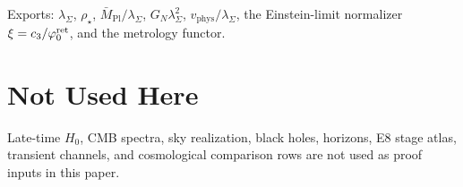 \documentclass[11pt,a4paper]{article}
\begin{document}
\begin{tfptexports}
Exports: $\lambda_\Sigma$, $\rho_\star$, $\bar M_{\mathrm{Pl}}/\lambda_\Sigma$, $G_N\lambda_\Sigma^2$, $v_{\mathrm{phys}}/\lambda_\Sigma$, the Einstein-limit normalizer $\xi=c_3/\varphi_0^{\mathrm{ret}}$, and the metrology functor.
\end{tfptexports}

\section{Not Used Here}

Late-time $H_0$, CMB spectra, sky realization, black holes, horizons, E8 stage atlas, transient
channels, and cosmological comparison rows are not used as proof inputs in this paper.
\end{document}
